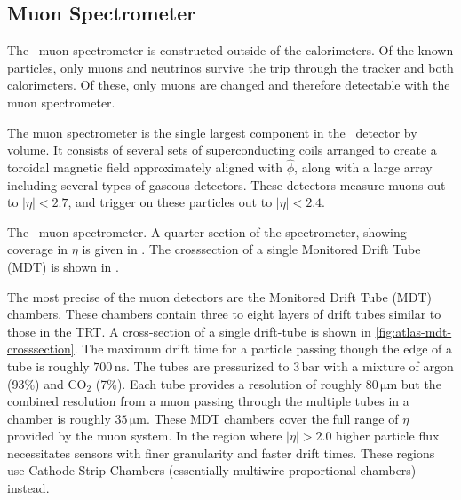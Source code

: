 \subsection{Muon Spectrometer}
The \atlas\ muon spectrometer is constructed outside of the calorimeters.
Of the known particles, only muons and neutrinos survive the trip through the tracker and both calorimeters.
Of these, only muons are changed and therefore detectable with the muon spectrometer.

The muon spectrometer is the single largest component in the \atlas\ detector by volume.
It consists of several sets of superconducting coils arranged to create a toroidal magnetic field approximately aligned with $\hat{\phi}$, along with a large array including several types of gaseous detectors.
These detectors measure muons out to $|\eta| < 2.7$, and trigger on these particles out to $|\eta| < 2.4$.

\begin{cfig}
  \caption[\atlas\ muon spectrometer]{The \atlas\ muon spectrometer.
    A quarter-section of the spectrometer, showing coverage in $\eta$ is given in .
    The crosssection of a single Monitored Drift Tube (MDT) is shown in .}
  \label{fig:atlas-muon-spec}
\end{cfig}

The most precise of the muon detectors are the Monitored Drift Tube (MDT) chambers.
These chambers contain three to eight layers of drift tubes similar to those in the TRT.
A cross-section of a single drift-tube is shown in \cref{fig:atlas-mdt-crosssection}.
The maximum drift time for a particle passing though the edge of a tube is roughly $700\,\mathrm{ns}$.
The tubes are pressurized to $3\,\mathrm{bar}$ with a mixture of argon (93\%) and CO$_2$ (7\%).
Each tube provides a resolution of roughly $80\,\mathrm{\mu m}$ but the combined resolution from a muon passing through the multiple tubes in a chamber is roughly $35\,\mathrm{\mu m}$.
These MDT chambers cover the full range of $\eta$ provided by the muon system.
In the region where $|\eta| > 2.0$ higher particle flux necessitates sensors with finer granularity and faster drift times.
These regions use Cathode Strip Chambers (essentially multiwire proportional chambers) instead.

